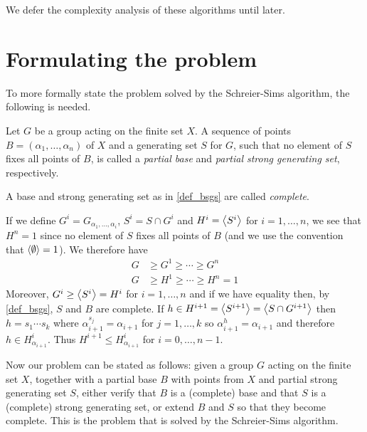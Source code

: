 We defer the complexity analysis of these algorithms until later.

\section{Formulating the problem}
To more formally state the problem solved by the Schreier-Sims algorithm, the following is needed.
\begin{deff}
  Let $G$ be a group acting on the finite set $X$. A sequence of points
  $B = (\alpha_1, \dotsc, \alpha_n)$ of $X$ and a generating set $S$ for $G$, such that no element of $S$ fixes all points of $B$, is called a \emph{partial base} and \emph{partial strong generating set}, respectively. 
\end{deff}
\begin{remark}
A base and strong generating set as in \ref{def_bsgs} are called \emph{complete}.
\end{remark}
\begin{remark} \label{rmk_partial_bsgs}
  If we define $G^i = G_{\alpha_1, \dotsc, \alpha_i}$, $S^i = S \cap
  G^i$ and $H^i = \left\langle S^i \right\rangle$ for $i = 1, \dotsc, n$, we see that $H^n
  = 1$ since no element of $S$ fixes all points of $B$ (and we use the
  convention that $\left\langle \emptyset \right\rangle = 1$). We therefore have
\begin{align}
G & \geq G^1 \geq \dotsb \geq G^n \\
G & \geq H^1 \geq \dotsb \geq H^n = 1 
\end{align}
Moreover, $G^i \geq \left\langle S^i \right\rangle = H^i$ for $i = 1, \dotsc, n$ and if we
have equality then, by \ref{def_bsgs}, $S$ and $B$ are complete. If $h
\in H^{i + 1} = \left\langle S^{i + 1} \right\rangle = \left\langle S \cap G^{i + 1} \right\rangle$ then $h = s_1 \dotsm s_k$ where $\alpha_{i + 1}^{s_j} = \alpha_{i + 1}$ for $j = 1, \dotsc, k$ so $\alpha_{i + 1}^h = \alpha_{i + 1}$ and therefore $h \in H^i_{\alpha_{i + 1}}$. Thus $H^{i + 1} \leq H^i_{\alpha_{i + 1}}$ for $i = 0, \dotsc, n - 1$.
\end{remark}

Now our problem can be stated as follows: given a group $G$ acting on the
finite set $X$, together with a partial base $B$ with points from $X$
and partial strong generating set $S$, either verify that $B$ is a
(complete) base and that $S$ is a (complete) strong generating set, or
extend $B$ and $S$ so that they become complete. This is the problem that is
solved by the Schreier-Sims algorithm.


